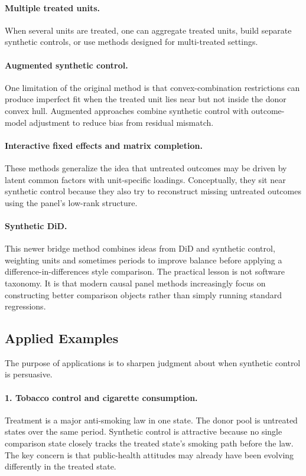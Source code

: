 \paragraph{Multiple treated units.}
When several units are treated, one can aggregate treated units, build separate synthetic controls, or use methods designed for multi-treated settings.

\paragraph{Augmented synthetic control.}
One limitation of the original method is that convex-combination restrictions can produce imperfect fit when the treated unit lies near but not inside the donor convex hull. Augmented approaches combine synthetic control with outcome-model adjustment to reduce bias from residual mismatch.

\paragraph{Interactive fixed effects and matrix completion.}
These methods generalize the idea that untreated outcomes may be driven by latent common factors with unit-specific loadings. Conceptually, they sit near synthetic control because they also try to reconstruct missing untreated outcomes using the panel's low-rank structure.

\paragraph{Synthetic \ac{DiD}.}
This newer bridge method combines ideas from \ac{DiD} and synthetic control, weighting units and sometimes periods to improve balance before applying a difference-in-differences style comparison. The practical lesson is not software taxonomy. It is that modern causal panel methods increasingly focus on constructing better comparison objects rather than simply running standard regressions.

\subsection{Applied Examples}
The purpose of applications is to sharpen judgment about when synthetic control is persuasive.

\paragraph{1. Tobacco control and cigarette consumption.}
Treatment is a major anti-smoking law in one state. The donor pool is untreated states over the same period. Synthetic control is attractive because no single comparison state closely tracks the treated state's smoking path before the law. The key concern is that public-health attitudes may already have been evolving differently in the treated state.


